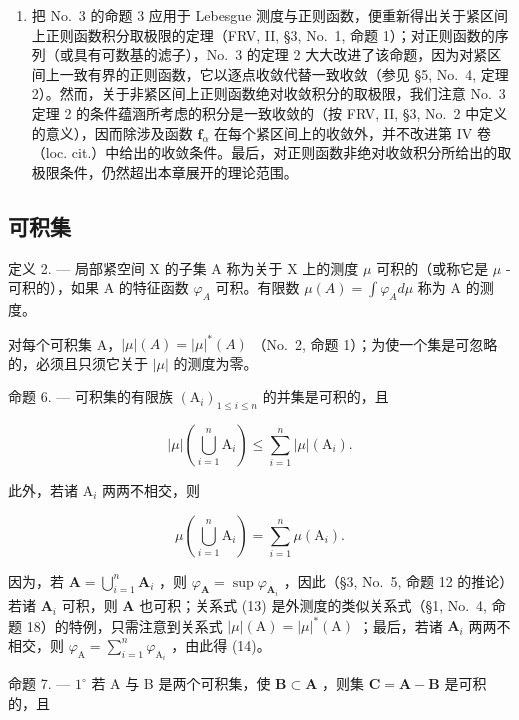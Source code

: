 \begin{enumerate}
\def\labelenumi{\arabic{enumi})}
\setcounter{enumi}{1}
\tightlist
\item
  把 No.~3 的命题 3 应用于 Lebesgue 测度与正则函数，便重新得出关于紧区间上正则函数积分取极限的定理（FRV, II, §3, No.~1, 命题 1）；对正则函数的序列（或具有可数基的滤子），No.~3 的定理 2 大大改进了该命题，因为对紧区间上一致有界的正则函数，它以逐点收敛代替一致收敛（参见 §5, No.~4, 定理 2）。然而，关于非紧区间上正则函数绝对收敛积分的取极限，我们注意 No.~3 定理 2 的条件蕴涵所考虑的积分是一致收敛的（按 FRV, II, §3, No.~2 中定义的意义），因而除涉及函数 \(\mathbf{f}_{\alpha}\) 在每个紧区间上的收敛外，并不改进第 IV 卷（loc. cit.）中给出的收敛条件。最后，对正则函数非绝对收敛积分所给出的取极限条件，仍然超出本章展开的理论范围。
\end{enumerate}

\subsection{可积集}

定义 2. --- 局部紧空间 X 的子集 A 称为关于 X 上的测度 \(\mu\) 可积的（或称它是 \(\mu\) -可积的），如果 A 的特征函数 \(\varphi_{A}\) 可积。有限数 \(\mu(A) = \int \varphi_{A} d\mu\) 称为 A 的测度。

对每个可积集 A，\(|\mu|(A) = |\mu|^{*}(A)\) （No.~2, 命题 1）；为使一个集是可忽略的，必须且只须它关于 \(|\mu|\) 的测度为零。

命题 6. --- 可积集的有限族 \((\mathrm{A}_{i})_{1\leqslant i\leqslant n}\) 的并集是可积的，且

\[
| \mu | \left(\bigcup_ {i = 1} ^ {n} \mathrm{A} _ {i}\right) \leqslant \sum_ {i = 1} ^ {n} | \mu | (\mathrm{A} _ {i}).\tag{13}
\]

此外，若诸 \(\mathrm{A}_i\) 两两不相交，则

\[
\mu \left(\bigcup_ {i = 1} ^ {n} \mathrm{A} _ {i}\right) = \sum_ {i = 1} ^ {n} \mu (\mathrm{A} _ {i}).\tag{14}
\]

因为，若 \(\mathbf{A} = \bigcup_{i=1}^{n} \mathbf{A}_i\) ，则 \(\varphi_{\mathbf{A}} = \sup \varphi_{\mathbf{A}_i}\) ，因此（§3, No.~5, 命题 12 的推论）若诸 \(\mathbf{A}_i\) 可积，则 \(\mathbf{A}\) 也可积；关系式 (13) 是外测度的类似关系式（§1, No.~4, 命题 18）的特例，只需注意到关系式 \(|\mu|(\mathrm{A}) = |\mu|^*(\mathrm{A})\) ；最后，若诸 \(\mathbf{A}_i\) 两两不相交，则 \(\varphi_{\mathrm{A}} = \sum_{i=1}^{n} \varphi_{\mathrm{A}_i}\) ，由此得 (14)。

命题 7. --- \(1^{\circ}\) 若 A 与 B 是两个可积集，使 \(\mathbf{B} \subset \mathbf{A}\) ，则集 \(\mathbf{C} = \mathbf{A} - \mathbf{B}\) 是可积的，且

